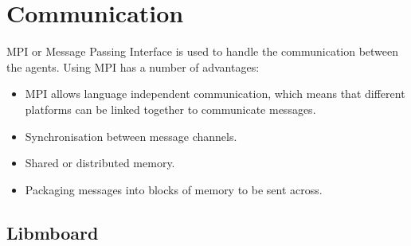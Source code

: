 \section{Communication}

MPI or Message Passing Interface is used to handle the communication between the agents. Using MPI has a number of advantages:

\begin{itemize}
\item MPI allows language independent communication, which means that different platforms can be linked together to communicate messages.
\item Synchronisation between message channels.
\item Shared or distributed memory.
\item Packaging messages into blocks of memory to be sent across.
\end{itemize}


\subsection{Libmboard}